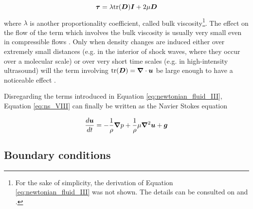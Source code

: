 %
	\begin{equation} \label{eq:newtonian_fluid_III}
		\boldsymbol{\tau} = \lambda \text{tr}( \boldsymbol{D})\boldsymbol{I} + 2\mu\boldsymbol{D}
	\end{equation}
%
where $\lambda$ is another proportionality coefficient, called bulk viscosity\footnote{For the sake of simplicity, the derivation of Equation \eqref{eq:newtonian_fluid_III} was not shown. The details can be consulted on \cite{Batchelor-2000} and \cite{Aris-1962}.}. The effect on the flow of the term which involves the bulk viscosity is usually very small even in compressible flows \citep{Batchelor-2000}. Only when density changes are induced either over extremely small distances (e.g. in the interior of shock waves, where they occur over a molecular scale) or over very short time scales (e.g. in high-intensity ultrasound) will the term involving $\text{tr}( \boldsymbol{D}) = \boldsymbol{\nabla}\cdot\boldsymbol{u}$ be large enough to have a noticeable effect \citep{Zeldovich-1967}.

Disregarding the terms introduced in Equation \eqref{eq:newtonian_fluid_III}, Equation \eqref{eq:ns_VIII} can finally be written as the Navier Stokes equation 

%
	\begin{equation} \label{eq:navier_momentum}
		\frac{d\boldsymbol{u}}{dt}= -\frac{1}{\rho}\boldsymbol{\nabla}p + \frac{1}{\rho}\mu \boldsymbol{\nabla}^2\boldsymbol{u} + \boldsymbol{g}
	\end{equation}
%




\subsection{Boundary conditions}
\label{subsec:boundary_cond}


